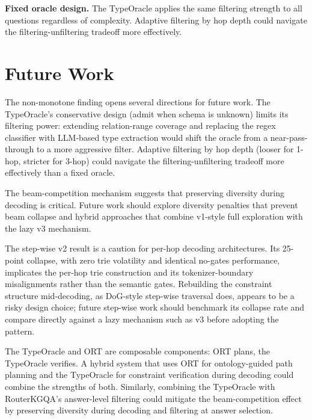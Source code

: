 \textbf{Fixed oracle design.} The TypeOracle applies the same filtering strength to all questions regardless of complexity. Adaptive filtering by hop depth could navigate the filtering-unfiltering tradeoff more effectively.

\section{Future Work}
\label{sec:ch5future}

The non-monotone finding opens several directions for future work. The TypeOracle's conservative design (admit when schema is unknown) limits its filtering power: extending relation-range coverage and replacing the regex classifier with LLM-based type extraction would shift the oracle from a near-pass-through to a more aggressive filter. Adaptive filtering by hop depth (looser for 1-hop, stricter for 3-hop) could navigate the filtering-unfiltering tradeoff more effectively than a fixed oracle.

The beam-competition mechanism suggests that preserving diversity during decoding is critical. Future work should explore diversity penalties that prevent beam collapse and hybrid approaches that combine v1-style full exploration with the lazy v3 mechanism.

The step-wise v2 result is a caution for per-hop decoding architectures. Its 25-point collapse, with zero trie volatility and identical no-gates performance, implicates the per-hop trie construction and its tokenizer-boundary misalignments rather than the semantic gates. Rebuilding the constraint structure mid-decoding, as DoG-style step-wise traversal does, appears to be a risky design choice; future step-wise work should benchmark its collapse rate and compare directly against a lazy mechanism such as v3 before adopting the pattern.

The TypeOracle and ORT \citep{liu2025ort} are composable components: ORT plans, the TypeOracle verifies. A hybrid system that uses ORT for ontology-guided path planning and the TypeOracle for constraint verification during decoding could combine the strengths of both. Similarly, combining the TypeOracle with RouterKGQA's answer-level filtering \citep{yuan2026routerkgqa} could mitigate the beam-competition effect by preserving diversity during decoding and filtering at answer selection.

